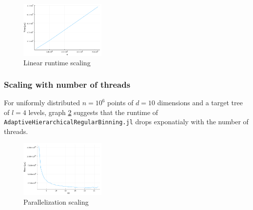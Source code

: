 \documentclass{juliacon}
\begin{document}
\begin{figure}[!ht]
  \centerline{
    \includegraphics[width=10pc]{figures/experiments/scale_n.png}
  }
  \caption{ Linear runtime scaling }
  \label{scale_n}
\end{figure}



\subsubsection{Scaling with number of threads}
For uniformly distributed $n=10^6$ points of $d=10$ dimensions and a target tree of
$l=4$ levels, graph \ref{scale_t} suggests that the runtime of
\verb|AdaptiveHierarchicalRegularBinning.jl| drops exponatialy
with the number of threads.

\begin{figure}[!ht]
  \centerline{
    \includegraphics[width=10pc]{figures/experiments/scale_t.png}
  }
  \caption{ Parallelization scaling }
  \label{scale_t}
\end{figure}
\end{document}
